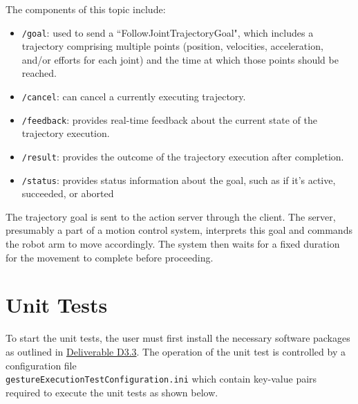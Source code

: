 \documentclass{CSSRforAfrica}
\begin{document}
The components of this topic include: 
\begin{itemize}
    \item \texttt{/goal}: used to send a ``FollowJointTrajectoryGoal", which includes a trajectory comprising multiple points (position, 
    velocities, acceleration, and/or efforts for each joint) and the time at which those points should be reached.
    \item \texttt{/cancel}: can cancel a currently executing trajectory.
    \item \texttt{/feedback}: provides real-time feedback about the current state of the trajectory 
    execution. 
    \item \texttt{/result}: provides the outcome of the trajectory execution after completion.
    \item \texttt{/status}: provides status information about the goal, such as if it's active, succeeded, or aborted
\end{itemize} 

The trajectory goal is sent to the action server through the client. The server, presumably a part of a 
motion control system, interprets this goal and commands the robot arm to move accordingly. The system 
then waits for a fixed duration for the movement to complete before proceeding.

\newpage
\section{Unit Tests}

To start the unit tests, the user must first install the necessary software packages as outlined in \href{https://cssr4africa.github.io/deliverables/CSSR4Africa_Deliverable_D3.3.pdf}
{Deliverable D3.3}. The operation of the unit test is controlled by a configuration file \\ \texttt{gestureExecutionTestConfiguration.ini} which contain key-value pairs required to execute the unit tests as shown below. 
\end{document}
